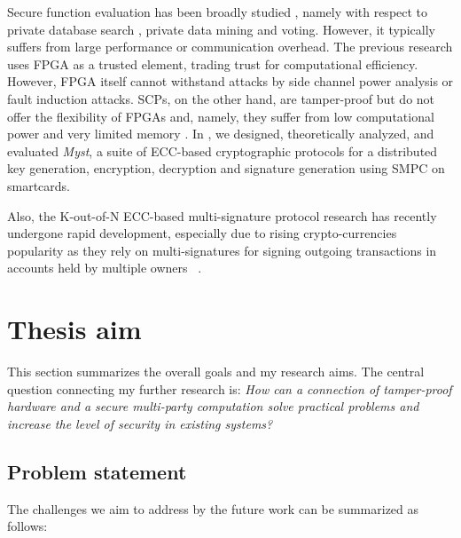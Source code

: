 \documentclass[
  digital, %
  twoside, %
  table,   %
  lof,     %
  lot,     %
]{fithesis3}
\theoremstyle{definition}
\theoremstyle{remark}
\begin{document}
\begin{ecmmnt}
Secure function evaluation has been broadly studied \cite{
yao82, conf/sp/SonghoriHS0K15, Malkhi:2004:FST:1251375.1251395, 10.1007/978-3-642-40041-4_5}, namely with respect to private database search \cite{Bertino2005, Naor:1999:PPA:336992.337028}, private data mining \cite{Aldeen2015} and voting. However, it typically suffers from large performance or communication overhead.
The previous research uses FPGA as a trusted element, trading trust for computational efficiency. However, FPGA itself cannot withstand attacks by side channel power analysis or fault induction attacks.
SCPs, on the other hand, are tamper-proof but do not offer the flexibility of FPGAs and, namely, they suffer from low computational power and very limited memory \cite{10.1007/978-3-642-19074-2_1, Boureanu:2015:LCC:2714576.2714591, cryptoeprint:2016:615}.
In \cite{2017-ccs-mavroudis}, we designed, theoretically analyzed, and evaluated \emph{Myst}, a suite of ECC-based cryptographic protocols for a distributed key generation, encryption, decryption and signature generation using SMPC on smartcards.

Also, the K-out-of-N ECC-based multi-signature protocol research has recently undergone rapid development, especially due to rising crypto-currencies popularity as they rely on multi-signatures for signing outgoing transactions in accounts held by multiple owners ~\cite{Bellare:2007:UAS:2394539.2394589, Bnz2017BulletproofsSP, cryptoeprint:2018:068}. 
\end{ecmmnt}



\chapter{Thesis aim}\label{sec:aim}
This section summarizes the overall goals and my research aims.
The central question connecting my further research is: \emph{How can a connection of tamper-proof hardware and a secure multi-party computation solve practical problems and increase the level of security in existing systems?}

\section{Problem statement}
The challenges we aim to address by the future work can be summarized as follows:
\end{document}
